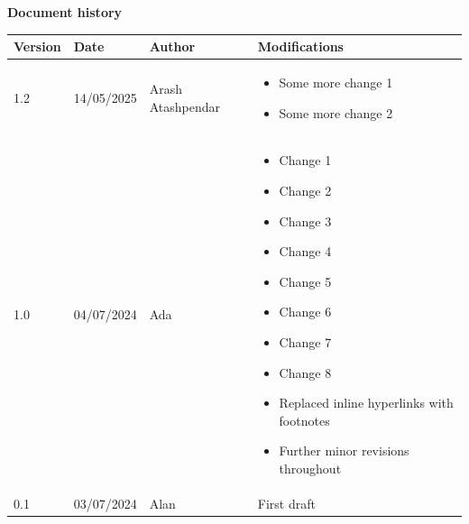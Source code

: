 \documentclass[
  11 pt,
  a4paper,
  table]{report}
\begin{document}
\pagebreak

\begin{flushleft}
    \textcolor{AlabRed}{\textbf{Document history}}\\
\end{flushleft}
\vspace{1ex}

\begin{tabular}{ | p{}| p{}| p{}| p{}| } %
    \hline
    \rowcolor{AlabTableColLightBlue}
    \textbf{Version} & \textbf{Date} & \textbf{Author} & \textbf{Modifications} \\
    \hline
    1.2 & 14/05/2025 & Arash Atashpendar & \begin{itemize}
      \item Some more change 1
      \item Some more change 2
      \end{itemize} \\ \hline
    1.0 & 04/07/2024 & Ada & \begin{itemize}
      \item Change 1
      \item Change 2
      \item Change 3
      \item Change 4
      \item Change 5
      \item Change 6
      \item Change 7
      \item Change 8
      \item Replaced inline hyperlinks with footnotes
      \item Further minor revisions throughout
      \end{itemize} \\ \hline
    0.1 & 03/07/2024 & Alan & First draft \\
    \hline
\end{tabular} %
\vspace{1ex}

        
\end{document}
